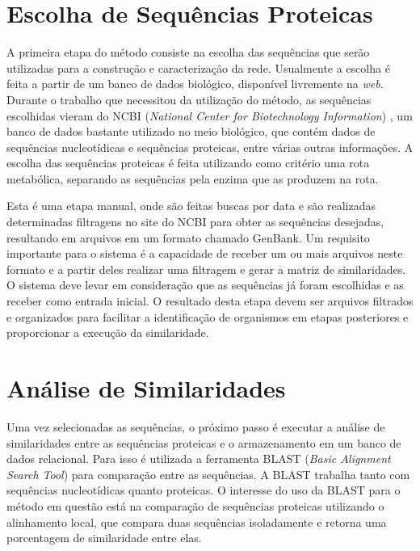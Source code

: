 \section{Escolha de Sequências Proteicas} \label{sec:escseq}

A primeira etapa do método consiste na escolha das sequências que serão utilizadas para a construção e caracterização da rede.
Usualmente a escolha é feita a partir de um banco de dados biológico, disponível livremente na \textit{web}. Durante o trabalho que necessitou da utilização
do método, as sequências escolhidas vieram do NCBI (\textit{National Center for Biotechnology Information}) \cite{ncbi},
um banco de dados bastante utilizado no
meio biológico, que contém dados de sequências
nucleotídicas e sequências proteicas, entre várias outras informações. A escolha das sequências proteicas é feita utilizando como critério
uma rota metabólica, separando as sequências pela enzima que as produzem na rota.


Esta é uma etapa manual, onde são feitas buscas por data e são realizadas determinadas filtragens no site do NCBI para obter as sequências desejadas, 
resultando em arquivos em um formato chamado GenBank. Um requisito importante para o sistema é a capacidade de receber um ou mais arquivos neste formato e
a partir deles
realizar uma filtragem e gerar a matriz de similaridades. O sistema deve levar em consideração que as sequências já foram escolhidas
e as receber como entrada inicial. O resultado desta etapa devem ser arquivos filtrados e organizados para facilitar a identificação de organismos em etapas
posteriores e proporcionar a execução da similaridade.

\section{Análise de Similaridades} \label{sec:similaridade}

Uma vez selecionadas as sequências, o próximo passo é executar a análise de similaridades entre as sequências proteicas e o armazenamento em um banco
de dados relacional. Para isso é utilizada a ferramenta BLAST (\textit{Basic Alignment Search Tool}) \cite{blast1997} para comparação entre as sequências.
A BLAST
trabalha tanto com sequências nucleotídicas quanto proteicas. O interesse do uso da BLAST para o método em questão está na comparação de sequências proteicas
utilizando o alinhamento local, que compara duas sequências isoladamente e retorna uma porcentagem de similaridade entre elas.

